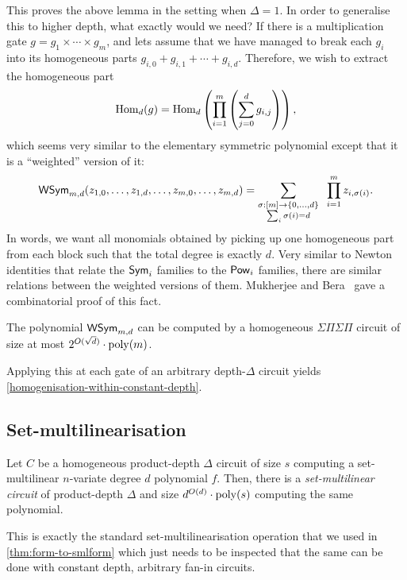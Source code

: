 This proves the above lemma in the setting when $\Delta = 1$. In order to generalise this to higher depth, what exactly would we need? If there is a multiplication gate $g = g_1 \times \cdots \times g_m$, and lets assume that we have managed to break each $g_i$ into its homogeneous parts $g_{i,0} + g_{i,1} + \cdots + g_{i,d}$. Therefore, we wish to extract the homogeneous part
\[
  \operatorname{Hom}_d(g) = \operatorname{Hom}_d\left(\prod_{i=1}^m \left(\sum_{j=0}^d g_{i,j}\right)\right),
\]
which seems very similar to the elementary symmetric polynomial except that it is a ``weighted'' version of it:
\[
  \operatorname{\mathsf{WSym}}_{m,d}( z_{1,0}, \ldots, z_{1,d}, \ldots, z_{m,0}, \ldots, z_{m,d}) = \sum_{\substack{\sigma: [m]\rightarrow \{0,\ldots, d\}\\ \sum_{i} \sigma(i) = d}} \;\;\prod_{i=1}^m z_{i, \sigma(i)}.
\]
In words, we want all monomials obtained by picking up one homogeneous part from each block such that the total degree is exactly $d$. Very similar to Newton identities that relate the $\operatorname{\mathsf{Sym}}_i$ families to the $\operatorname{\mathsf{Pow}}_i$ families, there are similar relations between the weighted versions of them. Mukherjee and Bera~\cite{MB18} gave a combinatorial proof of this fact.

\begin{lemmawp}[\cite{MB18}]
  The polynomial $\operatorname{\mathsf{WSym}}_{m,d}$ can be computed by a homogeneous $\Sigma\Pi\Sigma\Pi$ circuit of size at most $2^{O(\sqrt{d})} \cdot \operatorname{poly}(m)$. 
\end{lemmawp}

Applying this at each gate of an arbitrary depth-$\Delta$ circuit yields \autoref{homogenisation-within-constant-depth}.

\subsection{Set-multilinearisation}

\begin{lemma}
  \label{lem:set-multilinearisation-constant-depth}
  Let $C$ be a homogeneous product-depth $\Delta$ circuit of size $s$ computing a set-multilinear $n$-variate degree $d$ polynomial $f$. Then, there is a \emph{set-multilinear circuit} of product-depth $\Delta$ and size $d^{O(d)} \cdot \operatorname{poly}(s)$ computing the same polynomial. 
\end{lemma}

This is exactly the standard set-multilinearisation operation that we used in \autoref{thm:form-to-smlform} which just needs to be inspected that the same can be done with constant depth, arbitrary fan-in circuits.

